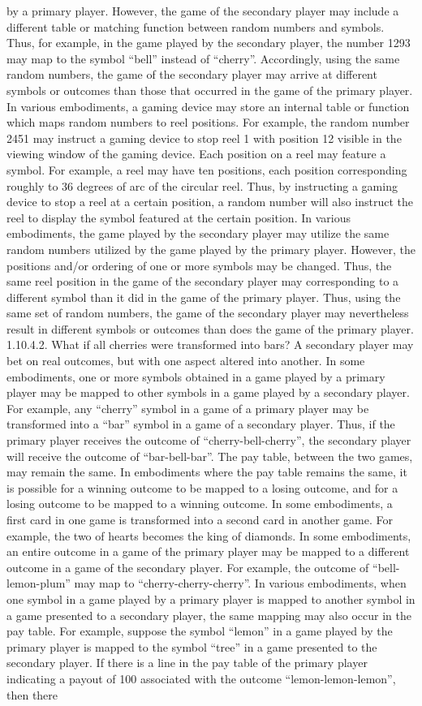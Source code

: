 \documentclass[11pt,a4paper]{article}
\begin{document}
by a primary player. However, the game of the secondary player may include a different table or matching function between random numbers and symbols. Thus, for example, in the game played by the secondary player, the number 1293 may map to the symbol “bell” instead of “cherry”. Accordingly, using the same random numbers, the game of the secondary player may arrive at different symbols or outcomes than those that occurred in the game of the primary player. In various embodiments, a gaming device may store an internal table or function which maps random numbers to reel positions. For example, the random number 2451 may instruct a gaming device to stop reel 1 with position 12 visible in the viewing window of the gaming device. Each position on a reel may feature a symbol. For example, a reel may have ten positions, each position corresponding roughly to 36 degrees of arc of the circular reel. Thus, by instructing a gaming device to stop a reel at a certain position, a random number will also instruct the reel to display the symbol featured at the certain position. In various embodiments, the game played by the secondary player may utilize the same random numbers utilized by the game played by the primary player. However, the positions and/or ordering of one or more symbols may be changed. Thus, the same reel position in the game of the secondary player may corresponding to a different symbol than it did in the game of the primary player. Thus, using the same set of random numbers, the game of the secondary player may nevertheless result in different symbols or outcomes than does the game of the primary player. 1.10.4.2. What if all cherries were transformed into bars? A secondary player may bet on real outcomes, but with one aspect altered into another. In some embodiments, one or more symbols obtained in a game played by a primary player may be mapped to other symbols in a game played by a secondary player. For example, any “cherry” symbol in a game of a primary player may be transformed into a “bar” symbol in a game of a secondary player. Thus, if the primary player receives the outcome of “cherry-bell-cherry”, the secondary player will receive the outcome of “bar-bell-bar”. The pay table, between the two games, may remain the same. In embodiments where the pay table remains the same, it is possible for a winning outcome to be mapped to a losing outcome, and for a losing outcome to be mapped to a winning outcome. In some embodiments, a first card in one game is transformed into a second card in another game. For example, the two of hearts becomes the king of diamonds. In some embodiments, an entire outcome in a game of the primary player may be mapped to a different outcome in a game of the secondary player. For example, the outcome of “bell-lemon-plum” may map to “cherry-cherry-cherry”. In various embodiments, when one symbol in a game played by a primary player is mapped to another symbol in a game presented to a secondary player, the same mapping may also occur in the pay table. For example, suppose the symbol “lemon” in a game played by the primary player is mapped to the symbol “tree” in a game presented to the secondary player. If there is a line in the pay table of the primary player indicating a payout of 100 associated with the outcome “lemon-lemon-lemon”, then there 
\end{document}
